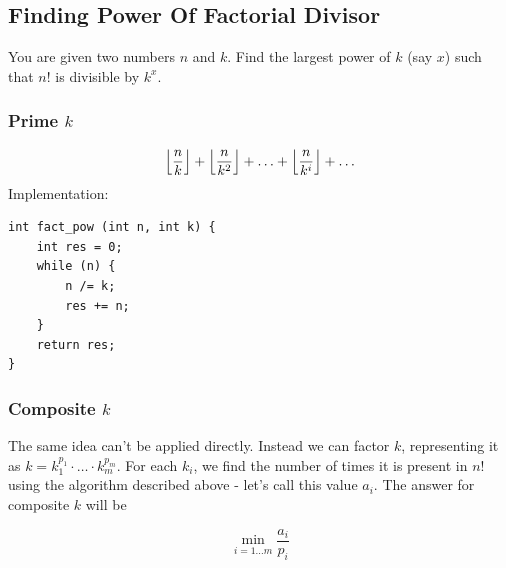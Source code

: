 \documentclass[8pt, a4paper, oneside, twocolumn]{extarticle}
\begin{document}
\subsection{Finding Power Of Factorial Divisor}
You are given two numbers $n$ and $k$. Find the largest power of $k$ (say $x$) such that $n!$ is divisible by $k^x$.
\subsubsection{Prime $k$}
$$\Bigl\lfloor\dfrac{n}{k}\Bigr\rfloor + \Bigl\lfloor\dfrac{n}{k^2}\Bigr\rfloor + \ldots + \Bigl\lfloor\dfrac{n}{k^i}\Bigr\rfloor + \ldots$$
Implementation:
\begin{verbatim}
int fact_pow (int n, int k) {
	int res = 0;
	while (n) {
		n /= k;
		res += n;
	}
	return res;
}
\end{verbatim}
\subsubsection{Composite $k$}

The same idea can't be applied directly. Instead we can factor $k$, representing it as $k = k_1^{p_1} \cdot \ldots \cdot k_m^{p_m}$. For each $k_i$, we find the number of times it is present in $n!$ using the algorithm described above - let's call this value $a_i$. The answer for composite $k$ will be

$$\min_ {i=1 \ldots m} \dfrac{a_i}{p_i}$$
\end{document}
